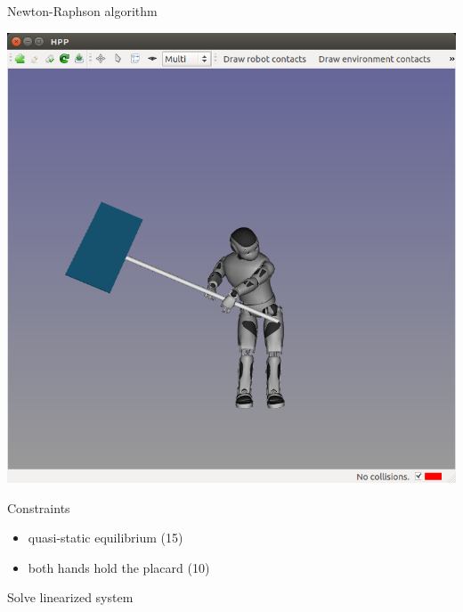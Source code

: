 \begin {frame} {Newton-Raphson algorithm}
  \parbox {.5\linewidth} {
    \centerline {
      \includegraphics [width=\linewidth] {figures/seq/romeo-5.png}
    }
  }
  \hspace*{.05\linewidth}
  \parbox {.39\linewidth} {
    Constraints
    \begin {itemize}
    \item quasi-static equilibrium (15)
    \item both hands hold the placard (10)
    \end{itemize}
  }
  \centerline {
    Solve linearized system
  }
\end {frame}

